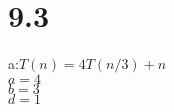 \documentclass{article}
\begin{document}
                                                                                                                                                                                                                                                                                                                                                                                                                                                                        \section{9.3}
                                                                                                                                                                                                                                                                                                                                                                                                                                                                                a:$T(n) = 4T(n/3) + n$\\
                                                                                                                                                                                                                                                                                                                                                                                                                                                                                        $a=4$\\
                                                                                                                                                                                                                                                                                                                                                                                                                                                                                                $b=3$\\
                                                                                                                                                                                                                                                                                                                                                                                                                                                                                                        $d=1$\\
\end{document}
